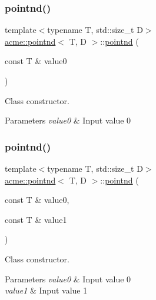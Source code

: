 \subsubsection{\texorpdfstring{pointnd()}{pointnd()}\hspace{0.1cm}{\footnotesize\ttfamily [1/7]}}
{\footnotesize\ttfamily template$<$typename T, std\+::size\+\_\+t D$>$ \\
\hyperlink{classacme_1_1pointnd}{acme\+::pointnd}$<$ T, D $>$\+::\hyperlink{classacme_1_1pointnd}{pointnd} (\begin{DoxyParamCaption}\item[{const T \&}]{value0 }\end{DoxyParamCaption})\hspace{0.3cm}{\ttfamily [inline]}}



Class constructor. 


\begin{DoxyParams}{Parameters}
{\em value0} & Input value 0 \\
\hline
\end{DoxyParams}
\mbox{\label{classacme_1_1pointnd_a44a24023bae0c265fa59db90003ff916}} 
\subsubsection{\texorpdfstring{pointnd()}{pointnd()}\hspace{0.1cm}{\footnotesize\ttfamily [2/7]}}
{\footnotesize\ttfamily template$<$typename T, std\+::size\+\_\+t D$>$ \\
\hyperlink{classacme_1_1pointnd}{acme\+::pointnd}$<$ T, D $>$\+::\hyperlink{classacme_1_1pointnd}{pointnd} (\begin{DoxyParamCaption}\item[{const T \&}]{value0,  }\item[{const T \&}]{value1 }\end{DoxyParamCaption})\hspace{0.3cm}{\ttfamily [inline]}}



Class constructor. 


\begin{DoxyParams}{Parameters}
{\em value0} & Input value 0 \\
\hline
{\em value1} & Input value 1 \\
\hline
\end{DoxyParams}
\mbox{\label{classacme_1_1pointnd_aac9ecea0a96f3b6d9a9e3b39066785d2}} 
